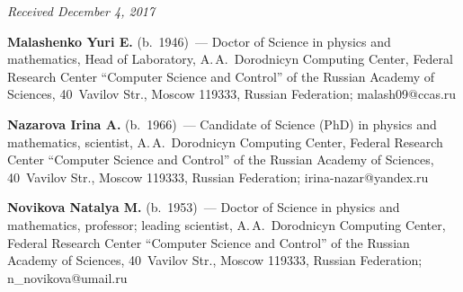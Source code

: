 \hfill{\small\textit{Received December 4, 2017}}


\vspace*{-18pt}

\Contr

\noindent
\textbf{Malashenko Yuri E.} (b.\ 1946)~--- 
Doctor of Science in physics and mathematics, Head of Laboratory, 
A.\,A.~Dorodnicyn Computing Center, Federal Research Center 
``Computer Science and Control'' of the Russian Academy of Sciences, 
40~Vavilov Str., Moscow 119333, Russian Federation; \mbox{malash09@ccas.ru}


\noindent
\textbf{Nazarova Irina A.} (b.\ 1966)~--- 
Candidate of Science (PhD) in physics and mathematics, scientist, 
A.\,A.~Dorodnicyn Computing Center, Federal Research Center 
``Computer Science and Control'' of the Russian Academy of Sciences, 
40~Vavilov Str., Moscow 119333, Russian Federation; \mbox{irina-nazar@yandex.ru}


\noindent
\textbf{Novikova Natalya M.} (b.\ 1953)~--- 
Doctor of Science in physics and mathematics, professor; leading scientist, 
A.\,A.~Dorodnicyn Computing Center, Federal Research Center 
``Computer Science and Control'' of the Russian Academy of Sciences, 
40~Vavilov Str., Moscow 119333, Russian Federation; \mbox{n\_novikova@umail.ru}
\label{end\stat}


\renewcommand{\bibname}{\protect\rm Литература} 